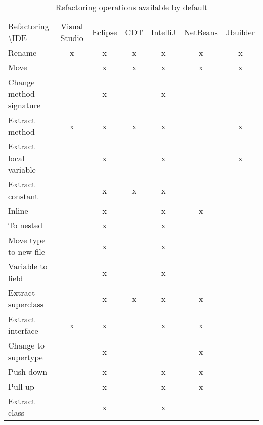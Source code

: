 \begin{table}
\caption{Refactoring operations available by default}
\label{tab-Comparing-Static}
\begin{tabular}{|l|c|c|c|c|c|c|}
\hline\noalign{\smallskip}
Refactoring \textbackslash IDE           & Visual Studio & Eclipse & CDT & IntelliJ & NetBeans & Jbuilder \\
\noalign{\smallskip}
\hline
\noalign{\smallskip}
Rename                    & x             & x       & x   & x        & x        & x        \\ \hline
Move                      &               & x       & x   & x        & x        & x        \\ \hline
Change method signature   &               & x       &     & x        &          &          \\ \hline
Extract method            & x             & x       & x   & x        &          & x        \\ \hline
Extract local variable    &               & x       &     & x        &          & x        \\ \hline
Extract constant          &               & x       & x   & x        &          &          \\ \hline
Inline                    &               & x       &     & x        & x        &          \\ \hline
To nested 			      &               & x       &     & x        &          &          \\ \hline
Move type to new file     &               & x       &     & x        &          &          \\ \hline
Variable to field         &               & x       &     & x        &          &          \\ \hline
Extract superclass        &               & x       & x   & x        & x        &          \\ \hline
Extract interface         & x             & x       &     & x        & x        &          \\ \hline
Change to supertype 	  &               & x       &     &          & x        &          \\ \hline
Push down                 &               & x       &     & x        & x        &          \\ \hline
Pull up                   &               & x       &     & x        & x        &          \\ \hline
Extract class             &               & x       &     & x        &          &          \\ \hline

\end{tabular}
\end{table}
